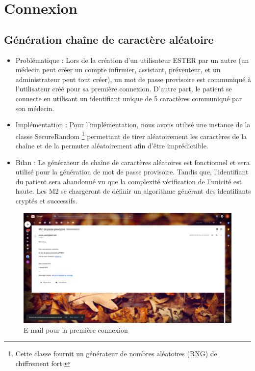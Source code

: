 \section{Connexion}

\subsection{Génération chaîne de caractère aléatoire}
    
\begin{itemize} 
\item Problématique :
Lors de la création d’un utilisateur ESTER par un autre (un médecin peut créer un compte infirmier, assistant, préventeur, et un administrateur peut tout créer), un mot de passe provisoire est communiqué à l’utilisateur créé pour sa première connexion.
D’autre part, le patient se connecte en utilisant un identifiant unique de 5 caractères communiqué par son médecin.
\item  Implémentation :
Pour l’implémentation, nous avons utilisé une instance de la classe SecureRandom \footnote{Cette classe fournit un générateur de nombres aléatoires (RNG) de chiffrement fort.} permettant de tirer aléatoirement les caractères de la chaîne et de la permuter aléatoirement afin d’être imprédictible.
\item  Bilan :
Le générateur de chaîne de caractères aléatoires est fonctionnel et sera utilisé pour la génération de mot de passe provisoire. Tandis que, l’identifiant du patient sera abandonné vu que la complexité vérification de l’unicité est haute. Les M2 se chargeront de définir un algorithme générant des identifiants cryptés et successifs.

\end{itemize}

\begin{figure}[H]
    \begin{center}
	\includegraphics[scale=0.25]{img/connexion/mailCo}
    \end{center}
    \caption{E-mail pour la première connexion}
\end{figure}

